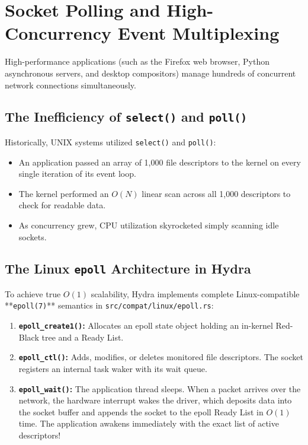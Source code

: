 \section{Socket Polling and High-Concurrency Event Multiplexing}
\label{sec:epoll_deep}

High-performance applications (such as the Firefox web browser, Python asynchronous servers, and desktop compositors) manage hundreds of concurrent network connections simultaneously.

\subsection{The Inefficiency of \texttt{select()} and \texttt{poll()}}
Historically, UNIX systems utilized \texttt{select()} and \texttt{poll()}:
\begin{itemize}
    \item An application passed an array of 1,000 file descriptors to the kernel on every single iteration of its event loop.
    \item The kernel performed an $O(N)$ linear scan across all 1,000 descriptors to check for readable data.
    \item As concurrency grew, CPU utilization skyrocketed simply scanning idle sockets.
\end{itemize}

\subsection{The Linux \texttt{epoll} Architecture in Hydra}
To achieve true $O(1)$ scalability, Hydra implements complete Linux-compatible **\texttt{epoll(7)}** semantics in \texttt{src/compat/linux/epoll.rs}:
\begin{enumerate}
    \item \textbf{\texttt{epoll\_create1()}:} Allocates an epoll state object holding an in-kernel Red-Black tree and a Ready List.
    \item \textbf{\texttt{epoll\_ctl()}:} Adds, modifies, or deletes monitored file descriptors. The socket registers an internal task waker with its wait queue.
    \item \textbf{\texttt{epoll\_wait()}:} The application thread sleeps. When a packet arrives over the network, the hardware interrupt wakes the driver, which deposits data into the socket buffer and appends the socket to the epoll Ready List in $O(1)$ time. The application awakens immediately with the exact list of active descriptors!
\end{enumerate}

